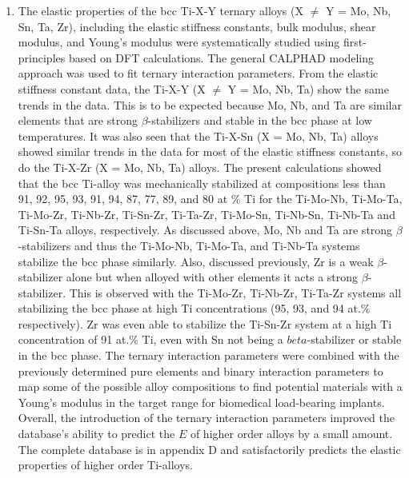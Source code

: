\begin{enumerate}
	\item The elastic properties of the bcc Ti-X-Y ternary alloys (X $\neq$ Y = Mo, Nb, Sn, Ta, Zr), including the elastic stiffness constants, bulk modulus, shear modulus, and Young's modulus were systematically studied using first-principles based on DFT calculations. The general CALPHAD modeling approach was used to fit ternary interaction parameters. From the elastic stiffness constant data, the Ti-X-Y (X $\neq$ Y = Mo, Nb, Ta) show the same trends in the data. This is to be expected because Mo, Nb, and Ta are similar elements that are strong $\beta$-stabilizers and stable in the bcc phase at low temperatures. It was also seen that the Ti-X-Sn (X = Mo, Nb, Ta) alloys showed similar trends in the data for most of the elastic stiffness constants, so do the Ti-X-Zr (X = Mo, Nb, Ta) alloys. The present calculations showed that the bcc Ti-alloy was mechanically stabilized at compositions less than 91, 92, 95, 93, 91, 94, 87, 77, 89, and 80 at \% Ti for the Ti-Mo-Nb, Ti-Mo-Ta, Ti-Mo-Zr, Ti-Nb-Zr, Ti-Sn-Zr, Ti-Ta-Zr, Ti-Mo-Sn, Ti-Nb-Sn, Ti-Nb-Ta and Ti-Sn-Ta alloys, respectively. As discussed above, Mo, Nb and Ta are strong $\beta$-stabilizers and thus the Ti-Mo-Nb, Ti-Mo-Ta, and Ti-Nb-Ta systems stabilize the bcc phase similarly. Also, discussed previously, Zr is a weak $\beta$-stabilizer alone but when alloyed with other elements it acts a strong $\beta$-stabilizer. This is observed with the Ti-Mo-Zr, Ti-Nb-Zr, Ti-Ta-Zr systems all stabilizing the bcc phase at high Ti concentrations (95, 93, and 94 at.\% respectively). Zr was even able to stabilize the Ti-Sn-Zr system at a high Ti concentration of 91 at.\% Ti, even with Sn not being a $beta$-stabilizer or stable in the bcc phase. The ternary interaction parameters were combined with the previously determined pure elements and binary interaction parameters to map some of the possible alloy compositions to find potential materials with a Young's modulus in the target range for biomedical load-bearing implants. Overall, the introduction of the ternary interaction parameters improved the database's ability to predict the $E$ of higher order alloys by a small amount. The complete database is in appendix D and satisfactorily predicts the elastic properties of higher order Ti-alloys.

\end{enumerate}
